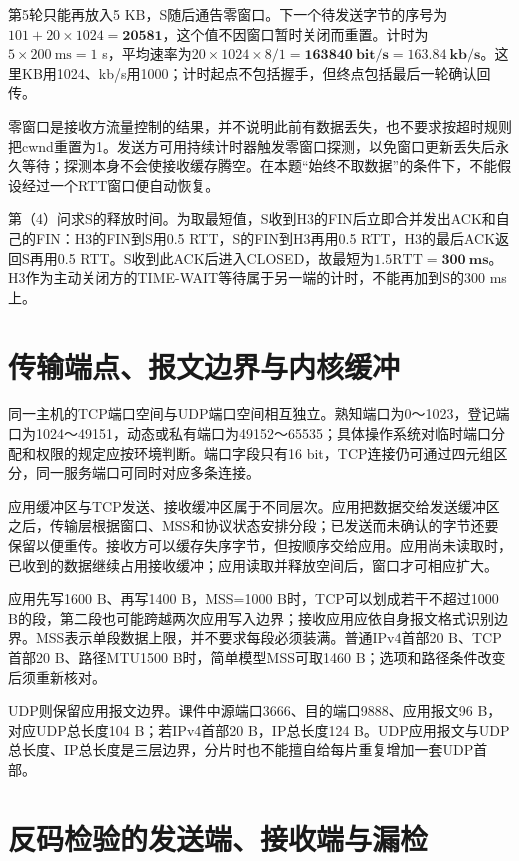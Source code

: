 第5轮只能再放入5 KB，S随后通告零窗口。下一个待发送字节的序号为\(101+20\times1024=\mathbf{20581}\)，这个值不因窗口暂时关闭而重置。计时为\(5\times200\mathrm{\ ms}=1\) s，平均速率为\(20\times1024\times8/1=\mathbf{163840\ bit/s}=\mathbf{163.84\ kb/s}\)。这里KB用1024、kb/s用1000；计时起点不包括握手，但终点包括最后一轮确认回传。

零窗口是接收方流量控制的结果，并不说明此前有数据丢失，也不要求按超时规则把cwnd重置为1。发送方可用持续计时器触发零窗口探测，以免窗口更新丢失后永久等待；探测本身不会使接收缓存腾空。在本题``始终不取数据''的条件下，不能假设经过一个RTT窗口便自动恢复。

第（4）问求S的释放时间。为取最短值，S收到H3的FIN后立即合并发出ACK和自己的FIN：H3的FIN到S用0.5 RTT，S的FIN到H3再用0.5 RTT，H3的最后ACK返回S再用0.5 RTT。S收到此ACK后进入CLOSED，故最短为\(1.5\mathrm{RTT}=\mathbf{300\ ms}\)。H3作为主动关闭方的TIME-WAIT等待属于另一端的计时，不能再加到S的300 ms上。

\section{传输端点、报文边界与内核缓冲}\label{CN05-course-buffers}

同一主机的TCP端口空间与UDP端口空间相互独立。熟知端口为0～1023，登记端口为1024～49151，动态或私有端口为49152～65535；具体操作系统对临时端口分配和权限的规定应按环境判断。端口字段只有16 bit，TCP连接仍可通过四元组区分，同一服务端口可同时对应多条连接。

应用缓冲区与TCP发送、接收缓冲区属于不同层次。应用把数据交给发送缓冲区之后，传输层根据窗口、MSS和协议状态安排分段；已发送而未确认的字节还要保留以便重传。接收方可以缓存失序字节，但按顺序交给应用。应用尚未读取时，已收到的数据继续占用接收缓冲；应用读取并释放空间后，窗口才可相应扩大。

应用先写1600 B、再写1400 B，MSS=1000 B时，TCP可以划成若干不超过1000 B的段，第二段也可能跨越两次应用写入边界；接收应用应依自身报文格式识别边界。MSS表示单段数据上限，并不要求每段必须装满。普通IPv4首部20 B、TCP首部20 B、路径MTU1500 B时，简单模型MSS可取1460 B；选项和路径条件改变后须重新核对。

UDP则保留应用报文边界。课件中源端口3666、目的端口9888、应用报文96 B，对应UDP总长度104 B；若IPv4首部20 B，IP总长度124 B。UDP应用报文与UDP总长度、IP总长度是三层边界，分片时也不能擅自给每片重复增加一套UDP首部。

\section{反码检验的发送端、接收端与漏检}\label{CN05-course-checksum}

